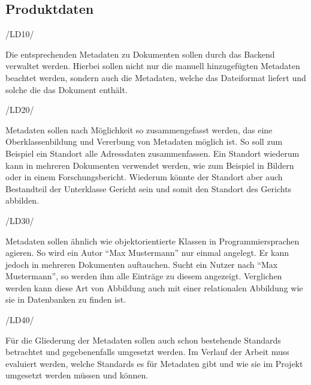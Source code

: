 \subsection{Produktdaten} \label{Produktdaten}
\begin{minipage}{3cm}
/LD10/
\end{minipage}
\begin{minipage}{13cm}
Die entsprechenden Metadaten zu Dokumenten sollen durch das Backend verwaltet werden. Hierbei sollen nicht nur die manuell hinzugef\"ugten Metadaten beachtet werden, sondern auch die Metadaten, welche das Dateiformat liefert und solche die das Dokument enth\"alt.\\
\end{minipage}
\begin{minipage}{3cm}
/LD20/
\end{minipage}
\begin{minipage}{13cm}
Metadaten sollen nach M\"oglichkeit so zusammengefasst werden, das eine Oberklassenbildung und Vererbung von Metadaten m\"oglich ist. So soll zum Beispiel ein Standort alle Adressdaten zusammenfassen. Ein Standort wiederum kann in mehreren Dokumenten verwendet werden, wie zum Beispiel in Bildern oder in einem Forschungsbericht. Wiederum k\"onnte der Standort aber auch Bestandteil der Unterklasse Gericht sein und somit den Standort des Gerichts abbilden.\\
\end{minipage}
\begin{minipage}{3cm}
/LD30/
\end{minipage}
\begin{minipage}{13cm}
Metadaten sollen \"ahnlich wie objektorientierte Klassen in Programmiersprachen agieren. So wird ein Autor "`Max Mustermann"' nur einmal angelegt. Er kann jedoch in mehreren Dokumenten auftauchen. Sucht ein Nutzer nach "`Max Mustermann"', so werden ihm alle Eintr\"age zu diesem angezeigt. Verglichen werden kann diese Art von Abbildung auch mit einer relationalen Abbildung wie sie in Datenbanken zu finden ist.\\
\end{minipage}
\begin{minipage}{3cm}
/LD40/
\end{minipage}
\begin{minipage}{13cm}
F\"ur die Gliederung der Metadaten sollen auch schon bestehende Standards betrachtet und gegebenenfalls umgesetzt werden.
Im Verlauf der Arbeit muss evaluiert werden, welche Standards es f\"ur Metadaten gibt und wie sie im Projekt umgesetzt werden m\"ussen und k\"onnen.
\cite{Wiki_Dublin_Core} \cite{Wiki_ISO_19115} \cite{Wiki_Exif} \cite{Wiki_Inspire}\\
\end{minipage}


